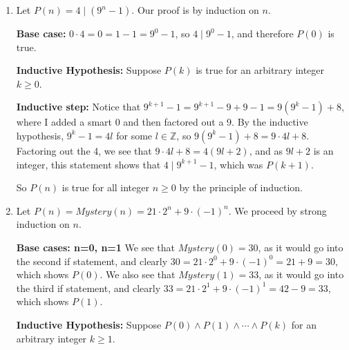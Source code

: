 \documentclass[12pt]{article}
\def\mbb#1{\mathbb{#1}}
\def\bZ{\mbb{Z}}
\theoremstyle{definition}
\theoremstyle{remark}
\newcommand\setItemnumber[1]{\setcounter{enumi}{\numexpr#1-1\relax}}
\begin{document}
\begin{enumerate}[leftmargin=\labelsep]
		\newpage
		\setItemnumber{4}
		\item Let $P(n) = 4 \mid (9^n - 1)$. Our proof is by induction on $n$. 
		
		\textbf{Base case:} $0 \cdot 4 = 0 = 1-1 = 9^0 - 1$, so $4 \mid 9^0 - 1$, and therefore $P(0)$ is true. 
		
		\textbf{Inductive Hypothesis: } Suppose $P(k)$ is true for an arbitrary integer $k \geq 0$. 
		
		\textbf{Inductive step: } Notice that $9^{k+1}-1=9^{k+1}-9+9-1 = 9(9^k-1)+8$, where I added a smart 0 and then factored out a 9. By the inductive hypothesis, $9^k-1 = 4l$ for some $l \in \bZ$, so $9(9^k-1)+8 = 9 \cdot 4l+8$. Factoring out the 4, we see that $9 \cdot 4l + 8 = 4(9l+2)$, and as $9l+2$ is an integer, this statement shows that $4 \mid 9^{k+1}-1$, which was $P(k+1)$. 
		
		So $P(n)$ is true for all integer $n \geq 0$ by the principle of induction.
		
		\newpage
		\item 
		Let $P(n) = Mystery(n) = 21 \cdot 2^n + 9 \cdot (-1)^n$. We proceed by strong induction on $n$.
		
		\textbf{Base cases: n=0, n=1} We see that $Mystery(0) = 30$, as it would go into the second if statement, and clearly $30 =21 \cdot 2^0 + 9 \cdot (-1)^0 = 21 + 9 = 30$, which shows $P(0)$. We also see that $Mystery(1) = 33$, as it would go into the third if statement, and clearly $33 = 21 \cdot 2^1 + 9 \cdot (-1)^1 = 42 - 9 = 33$, which shows $P(1)$.
		
		\textbf{Inductive Hypothesis:} Suppose $P(0) \land P(1) \land \cdots \land P(k)$ for an arbitrary integer $k \geq 1$. 
		

\end{enumerate}
\end{document}
